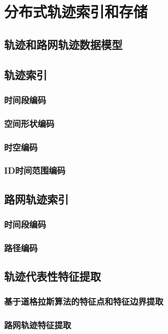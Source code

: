 \chapter{分布式轨迹索引和存储}
\section{轨迹和路网轨迹数据模型}
\section{轨迹索引}
\subsection{时间段编码}
\subsection{空间形状编码}
\subsection{时空编码}
\subsection{ID时间范围编码}
\section{路网轨迹索引}
\subsection{时间段编码}
\subsection{路径编码}
\section{轨迹代表性特征提取}
\subsection{基于道格拉斯算法的特征点和特征边界提取}
\subsection{路网轨迹特征提取}
